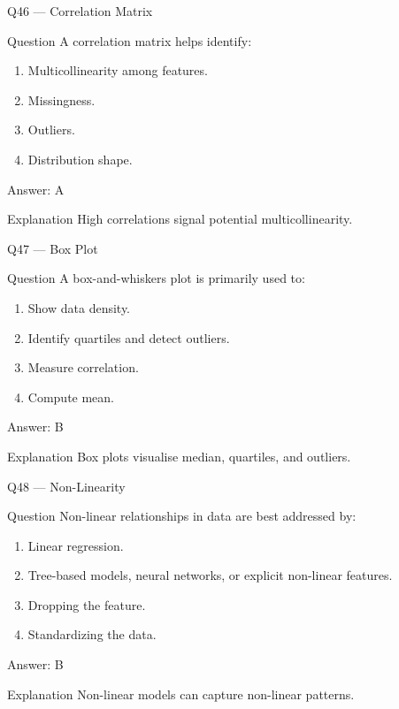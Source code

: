 \documentclass[aspectratio=169,8pt]{beamer}
\begin{document}
	\begin{frame}{Q46 --- Correlation Matrix}
		\begin{block}{Question}
			A correlation matrix helps identify:
		\end{block}
		\begin{enumerate}
			\item Multicollinearity among features.
			\item Missingness.
			\item Outliers.
			\item Distribution shape.
		\end{enumerate}
		\begin{exampleblock}{Answer: A}\end{exampleblock}
		\begin{block}{Explanation}
			High correlations signal potential multicollinearity.
		\end{block}
	\end{frame}
	
	\begin{frame}{Q47 --- Box Plot}
		\begin{block}{Question}
			A box-and-whiskers plot is primarily used to:
		\end{block}
		\begin{enumerate}
			\item Show data density.
			\item Identify quartiles and detect outliers.
			\item Measure correlation.
			\item Compute mean.
		\end{enumerate}
		\begin{exampleblock}{Answer: B}\end{exampleblock}
		\begin{block}{Explanation}
			Box plots visualise median, quartiles, and outliers.
		\end{block}
	\end{frame}
	
	\begin{frame}{Q48 --- Non-Linearity}
		\begin{block}{Question}
			Non-linear relationships in data are best addressed by:
		\end{block}
		\begin{enumerate}
			\item Linear regression.
			\item Tree-based models, neural networks, or explicit non-linear features.
			\item Dropping the feature.
			\item Standardizing the data.
		\end{enumerate}
		\begin{exampleblock}{Answer: B}\end{exampleblock}
		\begin{block}{Explanation}
			Non-linear models can capture non-linear patterns.
		\end{block}
	\end{frame}
	
\end{document}
